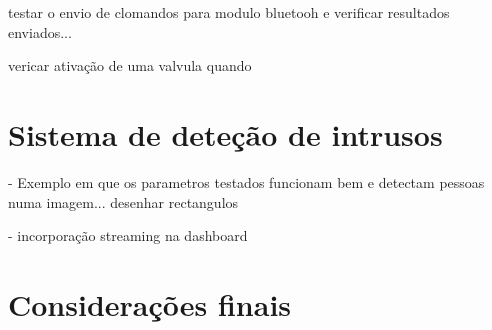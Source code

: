 testar o envio de clomandos para modulo bluetooh e verificar resultados enviados... 

vericar ativação de uma valvula quando 



\section{Sistema de deteção de intrusos}

- Exemplo em que os parametros testados funcionam bem e detectam pessoas numa imagem... desenhar rectangulos

- incorporação streaming na dashboard 



\section{Considerações finais}


